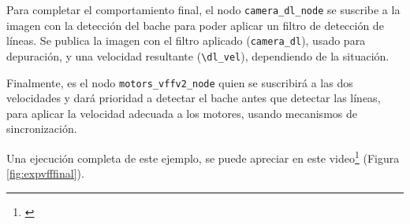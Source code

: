 Para completar el comportamiento final, el nodo \verb|camera_dl_node| se suscribe a la imagen con la detección del bache para poder aplicar un filtro de detección de líneas. Se publica la imagen con el filtro aplicado (\verb|camera_dl|), usado para depuración, y una velocidad resultante (\verb|\dl_vel|), dependiendo de la situación.

Finalmente, es el nodo \verb|motors_vffv2_node| quien se suscribirá a las dos velocidades y dará prioridad a detectar el bache antes que detectar las líneas, para aplicar la velocidad adecuada a los motores, usando mecanismos de sincronización.

Una ejecución completa de este ejemplo, se puede apreciar en este video\footnote{\url{}} (Figura \ref{fig:expvfffinal}). 


